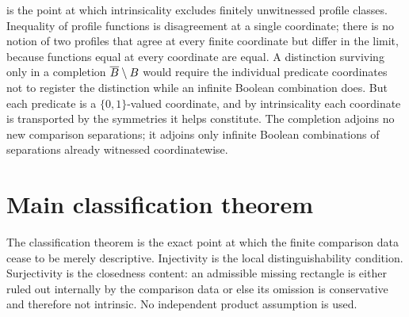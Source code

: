 \begin{remark}
	\label{rem:no-limit-only-separation}
	 is the point at which
	intrinsicality excludes finitely unwitnessed profile classes. Inequality
	of profile functions is disagreement at a single coordinate; there is no
	notion of two profiles that agree at every finite coordinate but differ
	in the limit, because functions equal at every coordinate are equal. A
	distinction surviving only in a completion
	\(\overline{B}\setminus B\) would require the individual predicate
	coordinates not to register the distinction while an infinite Boolean
	combination does. But each predicate is a \(\{0,1\}\)-valued coordinate,
	and by intrinsicality each coordinate is transported by the symmetries it
	helps constitute. The completion adjoins no new comparison separations;
	it adjoins only infinite Boolean combinations of separations already
	witnessed coordinatewise.
\end{remark}
\section{Main classification theorem}
\label{sec:classification}
The classification theorem is the exact point at which the finite
comparison data cease to be merely descriptive.  Injectivity is the
local distinguishability condition.  Surjectivity is the closedness
content: an admissible missing rectangle is either ruled out internally
by the comparison data or else its omission is conservative and therefore
not intrinsic.  No independent product assumption is used.

